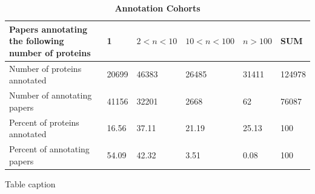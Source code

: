 \documentclass[12pt]{article}
\begin{document}
\begin{table}[!ht]
\caption{
\bf{Annotation Cohorts}}
\begin{tabular}{||p{5cm}||l|l|l|l||l||}
\hline
Papers annotating the following number of proteins & 1 & $2<n<10$ & $10<n<100$ & $n>100$ 
& SUM \\ \hline
Number of proteins annotated & 20699 & 46383 & 26485 & 31411 & 124978 \\ \hline
Number of annotating papers & 41156 & 32201 & 2668 & 62 &  76087 \\ \hline
Percent of proteins annotated & 16.56 & 37.11 & 21.19 & 25.13 & 100 \\ \hline
Percent of annotating papers & 54.09 & 42.32 & 3.51 & 0.08 & 100 \\ \hline 
\end{tabular}
\begin{flushleft}Table caption
\end{flushleft}
\label{tab:cohorts}
\end{table}
\end{document}

